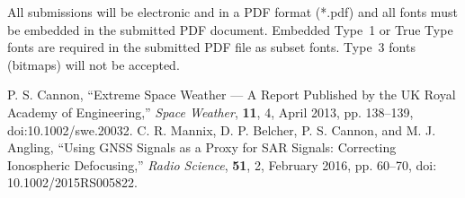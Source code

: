 \documentclass[abstract]{ursi}
\begin{document}
All submissions will be electronic and in a PDF format (*.pdf) and all
fonts must be embedded in the submitted PDF document.
Embedded Type~1 or True Type fonts are required in the submitted PDF file
as subset fonts. Type~3 fonts (bitmaps) will not be accepted. 

\begin{thebibliography}{99}
 P. S. Cannon, ``Extreme Space Weather --- A Report
  Published by the UK Royal Academy of Engineering,'' \emph{Space Weather},
  \textbf{11}, 4, April 2013, pp. 138--139, doi:10.1002/swe.20032.
 C. R. Mannix, D. P. Belcher, P. S. Cannon, and
  M. J. Angling, ``Using GNSS Signals as a Proxy for SAR Signals:
  Correcting Ionospheric Defocusing,'' \emph{Radio Science}, \textbf{51},
  2, February 2016, pp. 60--70, doi: 10.1002/2015RS005822.
\end{thebibliography}
\end{document}
